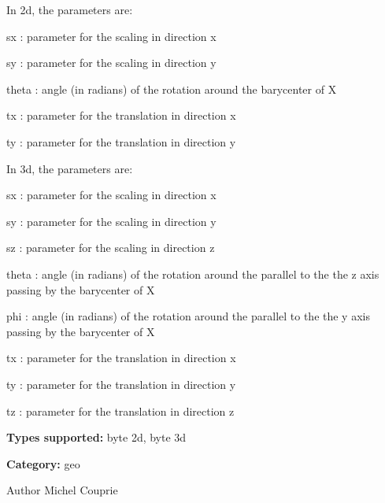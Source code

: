 In 2d, the parameters are: \begin{DoxyItemize}
\item sx : parameter for the scaling in direction x \item sy : parameter for the scaling in direction y \item theta : angle (in radians) of the rotation around the barycenter of X \item tx : parameter for the translation in direction x \item ty : parameter for the translation in direction y\end{DoxyItemize}
In 3d, the parameters are: \begin{DoxyItemize}
\item sx : parameter for the scaling in direction x \item sy : parameter for the scaling in direction y \item sz : parameter for the scaling in direction z \item theta : angle (in radians) of the rotation around the parallel to the the z axis passing by the barycenter of X \item phi : angle (in radians) of the rotation around the parallel to the the y axis passing by the barycenter of X \item tx : parameter for the translation in direction x \item ty : parameter for the translation in direction y \item tz : parameter for the translation in direction z\end{DoxyItemize}
{\bfseries Types supported:} byte 2d, byte 3d

{\bfseries Category:} geo

\begin{DoxyAuthor}{Author}
Michel Couprie 
\end{DoxyAuthor}
